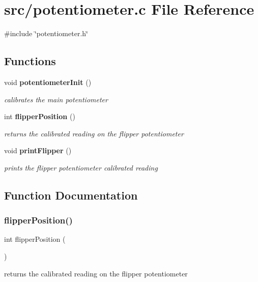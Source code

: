 \section{src/potentiometer.c File Reference}
\label{potentiometer_8c}
{\ttfamily \#include \char`\"{}potentiometer.\+h\char`\"{}}\newline
\subsection*{Functions}
\begin{DoxyCompactItemize}
\item 
void \textbf{ potentiometer\+Init} ()
\begin{DoxyCompactList}\small\item\em calibrates the main potentiometer \end{DoxyCompactList}\item 
int \textbf{ flipper\+Position} ()
\begin{DoxyCompactList}\small\item\em returns the calibrated reading on the flipper potentiometer \end{DoxyCompactList}\item 
void \textbf{ print\+Flipper} ()
\begin{DoxyCompactList}\small\item\em prints the flipper potentiometer calibrated reading \end{DoxyCompactList}\end{DoxyCompactItemize}


\subsection{Function Documentation}
\mbox{\label{potentiometer_8c_a017a6ff636af5e7916ffc8229dc408d3}} 
\subsubsection{flipper\+Position()}
{\footnotesize\ttfamily int flipper\+Position (\begin{DoxyParamCaption}{ }\end{DoxyParamCaption})}



returns the calibrated reading on the flipper potentiometer 

